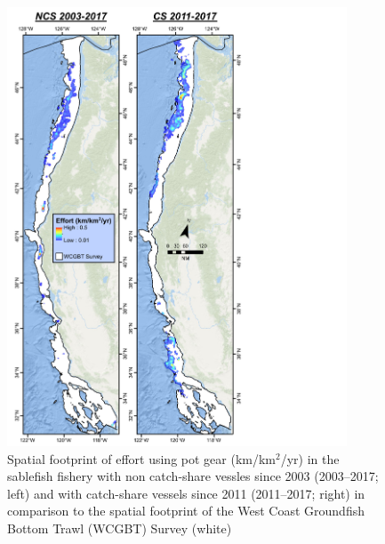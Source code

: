 \documentclass[11pt,
  english,
  a4paper,
]{article}
\begin{document}
\begin{figure}
\centering
\includegraphics[width=0.9\textwidth,height=0.9\textheight]{figs/Sablefish_Figures_POT_lnDens_2views_avg.pdf}
\caption{Spatial footprint of effort using pot gear (km/km{\(^2\)\leavevmode\tagmcend\tagstructend}/yr) in the sablefish fishery with non catch-share vessles since 2003 (2003--2017; left) and with catch-share vessels since 2011 (2011--2017; right) in comparison to the spatial footprint of the West Coast Groundfish Bottom Trawl (WCGBT) Survey (white)\label{fig:footprint_pot}}
\end{figure}

\tagmcend\tagstructend

\end{document}
